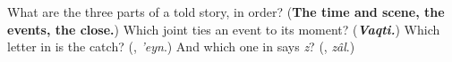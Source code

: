 \begin{tcolorbox}[breakable,colback=teal!4,colframe=teal!35!black,title={Before you move on}]
What are the three parts of a told story, in order? (\textbf{The time and scene, the events, the close.}) Which joint ties an event to its moment? (\emph{\textbf{Vaqti.}}) Which letter in \textbf{} is the catch? (\textbf{}, \emph{'eyn}.) And which one in \textbf{} says \emph{z}? (\textbf{}, \emph{zâl}.)
\end{tcolorbox}
